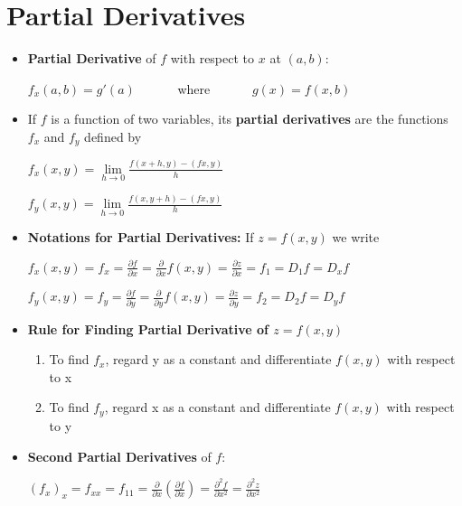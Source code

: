 \documentclass{report}
\begin{document}
	\section{Partial Derivatives}
		\begin{itemize}\addtolength{\leftskip}{2em}
			\item \textbf{Partial Derivative} of $f$ with respect to $x$ at $(a,b)$:
			\begin{center}
			\Large$f_x(a,b)=g'(a)\quad\quad\quad$ where $\quad\quad\quad g(x)=f(x,b)$
			\end{center}
			\item If $f$ is a function of two variables, its \textbf{partial derivatives} are the functions $f_x$ and $f_y$ defined by
			\begin{center}
			$f_x(x,y)=\lim\limits_{h\rightarrow 0}\frac{f(x+h,y)-(fx,y)}{h}$
			\end{center}
			\begin{center}
			$f_y(x,y)=\lim\limits_{h\rightarrow 0}\frac{f(x,y+h)-(fx,y)}{h}$
			\end{center}
			\item \textbf{Notations for Partial Derivatives:} If $z=f(x,y)$ we write
			\begin{center}
			\Large$f_x(x,y)=f_x=\frac{\partial f}{\partial x}=\frac{\partial}{\partial x}f(x,y)=\frac{\partial z}{\partial x}=f_1=D_1f=D_xf$
			\end{center}
			\begin{center}
			\Large$f_y(x,y)=f_y=\frac{\partial f}{\partial y}=\frac{\partial}{\partial y}f(x,y)=\frac{\partial z}{\partial y}=f_2=D_2f=D_yf$
			\end{center}
			\item \textbf{Rule for Finding Partial Derivative of $z=f(x,y)$}
			\begin{enumerate}\addtolength{\leftskip}{4em}
				\item To find $f_x$, regard y as a constant and differentiate $f(x,y)$ with respect to x
				\item To find $f_y$, regard x as a constant and differentiate $f(x,y)$ with respect to y
			\end{enumerate}
			\item \textbf{Second Partial Derivatives} of $f$:
			\begin{center}
			\Large$(f_x)_x=f_{xx}=f_{11}=\frac{\partial}{\partial x}(\frac{\partial f}{\partial x})=\frac{\partial ^2f}{\partial x^2}=\frac{\partial ^2z}{\partial x^2}$
			\end{center}

\end{itemize}
\end{document}
